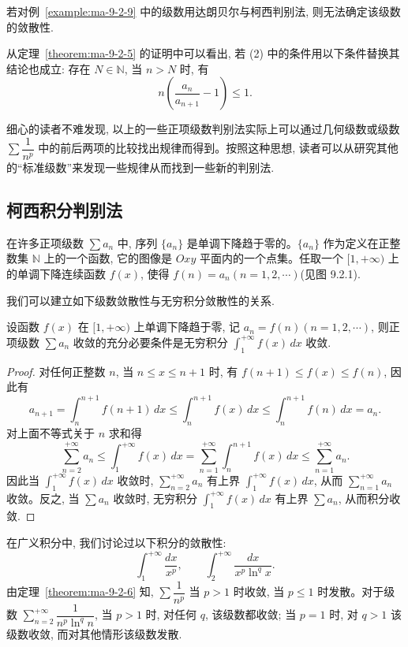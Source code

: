 \begin{remark}\label{remark:ma-9-source-48}
若对例~\ref{example:ma-9-2-9} 中的级数用达朗贝尔与柯西判别法, 则无法确定该级数的敛散性.
\end{remark}

从定理~\ref{theorem:ma-9-2-5} 的证明中可以看出, 若 (2) 中的条件用以下条件替换其结论也成立: 存在 $N\in\mathbb{N}$, 当 $n>N$ 时, 有
\[
  n\left(\frac{a_n}{a_{n+1}}-1\right)\leq1.
\]

细心的读者不难发现, 以上的一些正项级数判别法实际上可以通过几何级数或级数 $\sum\dfrac1{n^p}$ 中的前后两项的比较找出规律而得到。按照这种思想, 读者可以从研究其他的``标准级数''来发现一些规律从而找到一些新的判别法.

\subsection{柯西积分判别法}
\label{subsec:ma-9-2-4}

在许多正项级数 $\sum a_n$ 中, 序列 $\{a_n\}$ 是单调下降趋于零的。$\{a_n\}$ 作为定义在正整数集 $\mathbb{N}$ 上的一个函数, 它的图像是 $Oxy$ 平面内的一个点集。任取一个 $[1,+\infty)$ 上的单调下降连续函数 $f(x)$, 使得 $f(n)=a_n(n=1,2,\cdots)$(见图 9.2.1).

我们可以建立如下级数敛散性与无穷积分敛散性的关系.

\begin{theorem}\label{theorem:ma-9-2-6}
设函数 $f(x)$ 在 $[1,+\infty)$ 上单调下降趋于零, 记 $a_n=f(n)(n=1,2,\cdots)$, 则正项级数 $\sum a_n$ 收敛的充分必要条件是无穷积分 $\int_1^{+\infty}f(x)\,dx$ 收敛.
\end{theorem}


\begin{proof}
对任何正整数 $n$, 当 $n\leq x\leq n+1$ 时, 有 $f(n+1)\leq f(x)\leq f(n)$, 因此有
\[
  a_{n+1}=\int_n^{n+1}f(n+1)\,dx\leq\int_n^{n+1}f(x)\,dx\leq\int_n^{n+1}f(n)\,dx=a_n.
\]
对上面不等式关于 $n$ 求和得
\[
  \sum_{n=2}^{+\infty}a_n\leq\int_1^{+\infty}f(x)\,dx
  =\sum_{n=1}^{+\infty}\int_n^{n+1}f(x)\,dx
  \leq\sum_{n=1}^{+\infty}a_n.
\]
因此当 $\int_1^{+\infty}f(x)\,dx$ 收敛时, $\sum\limits_{n=2}^{+\infty}a_n$ 有上界 $\int_1^{+\infty}f(x)\,dx$, 从而 $\sum\limits_{n=1}^{+\infty}a_n$ 收敛。反之, 当 $\sum a_n$ 收敛时, 无穷积分 $\int_1^{+\infty}f(x)\,dx$ 有上界 $\sum a_n$, 从而积分收敛.
\end{proof}


在广义积分中, 我们讨论过以下积分的敛散性:
\[
  \int_1^{+\infty}\frac{dx}{x^p},\qquad
  \int_2^{+\infty}\frac{dx}{x^p\ln^q x}.
\]
由定理~\ref{theorem:ma-9-2-6} 知, $\sum\dfrac1{n^p}$ 当 $p>1$ 时收敛, 当 $p\leq1$ 时发散。对于级数 $\sum\limits_{n=2}^{+\infty}\dfrac1{n^p\ln^q n}$, 当 $p>1$ 时, 对任何 $q$, 该级数都收敛; 当 $p=1$ 时, 对 $q>1$ 该级数收敛, 而对其他情形该级数发散.

